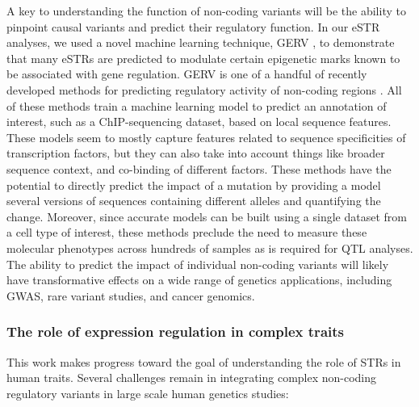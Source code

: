 A key to understanding the function of non-coding variants will be the ability to pinpoint causal variants and predict their regulatory function. In our eSTR analyses, we used a novel machine learning technique, GERV \cite{ZengHashimotoKangEtAl2015a}, to demonstrate that many eSTRs are predicted to modulate certain epigenetic marks known to be associated with gene regulation. GERV is one of a handful of recently developed methods for predicting regulatory activity of non-coding regions \cite{Kelley028399,Zhou:2015aa,Alipanahi:2015aa,Lee:2015aa}. All of these methods train a machine learning model to predict an annotation of interest, such as a ChIP-sequencing dataset, based on local sequence features. These models seem to mostly capture features related to sequence specificities of transcription factors, but they can also take into account things like broader sequence context, and co-binding of different factors. These methods have the potential to directly predict the impact of a mutation by providing a model several versions of sequences containing different alleles and quantifying the change. Moreover, since accurate models can be built using a single dataset from a cell type of interest, these methods preclude the need to measure these molecular phenotypes across hundreds of samples as is required for QTL analyses. The ability to predict the impact of individual non-coding variants will likely have transformative effects on a wide range of genetics applications, including GWAS, rare variant studies, and cancer genomics.

\subsubsection{The role of expression regulation in complex traits} 
This work makes progress toward the goal of understanding the role of STRs in human traits. Several challenges remain in integrating complex non-coding regulatory variants in large scale human genetics studies:

